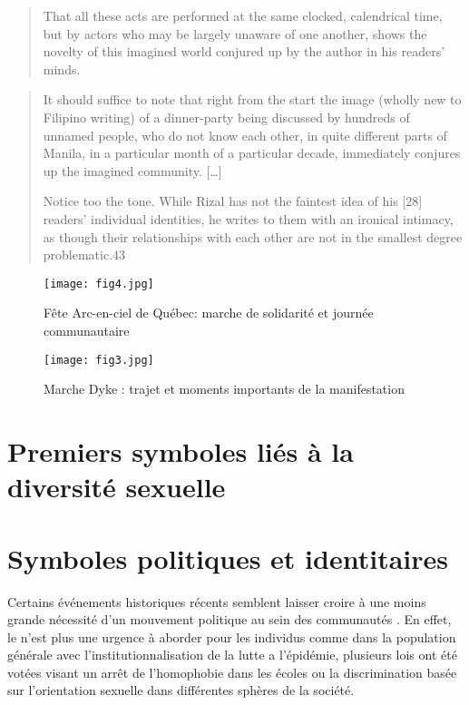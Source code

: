 \begin{quote}
  That all these acts are performed at the same clocked, calendrical time, but by actors who may be largely unaware of one another, shows the novelty of this imagined world conjured up by the author in his readers’ minds.
\citep[26]{Anderson 1983}
\end{quote}

\begin{quote}
	
It should suffice to note that right from the start the image (wholly new to Filipino writing) of a dinner-party being discussed by hundreds of unnamed people, who do not know each other, in quite different parts of Manila, in a particular month of a particular decade, immediately conjures up the imagined community.
[\ldots]

Notice too the tone. 
While Rizal has not the faintest idea of his [28] readers’ individual identities, he writes to them with an ironical intimacy, as though their relationships with each other are not in the smallest degree problematic.43
\end{quote}


\begin{figure}[ht]
	\centering
	\texttt{[image: fig4.jpg]}
	\caption{Fête Arc-en-ciel de Québec: marche de solidarité et journée
    communautaire}
	\label{fig:figure4}
\end{figure}

\begin{figure}[ht]
	\centering
	\texttt{[image: fig3.jpg]}
	\caption[]{Marche Dyke : trajet et moments importants de la manifestation}
	\label{fig:figure3}
\end{figure}


\section{Premiers symboles liés à la diversité sexuelle}
\label{sec:premiers_symboles_li_s_la_diversit_sexuelle}


\section{Symboles politiques et identitaires}
\label{sec:symboles_politiques_et_identitaire}
Certains événements historiques récents semblent laisser croire à une moins grande nécessité d'un mouvement politique au sein des communautés \lgbt{}.
En effet, le \sida{} n'est plus une urgence à aborder pour les individus \lgbt{} comme dans la population générale avec l'institutionnalisation de la lutte a l'épidémie, plusieurs lois ont été votées visant un arrêt de l'homophobie dans les écoles ou la discrimination basée sur l'orientation sexuelle dans différentes sphères de la société.

